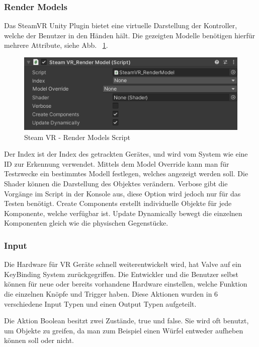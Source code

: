 \subsubsection{Render Models}
Das SteamVR Unity Plugin bietet eine virtuelle Darstellung der Kontroller, welche der Benutzer in den Händen hält.
Die gezeigten Modelle benötigen hierfür mehrere Attribute, siehe Abb. ~\ref{fig:steamvr_render_models Script}.
\begin {figure}
    \centering
    \includegraphics[scale=1]{pics/steamVR_render_models_script}
    \caption{Steam VR - Render Models Script}
    \label{fig:steamvr_render_models Script}
\end {figure}
Der Index ist der Index des getrackten Gerätes, und wird vom System wie eine ID zur Erkennung verwendet.
Mittels dem Model Override kann man für Testzwecke ein bestimmtes Modell festlegen, welches angezeigt werden soll.
Die Shader können die Darstellung des Objektes verändern.
Verbose gibt die Vorgänge im Script in der Konsole aus, diese Option wird jedoch nur für das Testen benötigt.
Create Components erstellt individuelle Objekte für jede Komponente, welche verfügbar ist.
Update Dynamically bewegt die einzelnen Komponenten gleich wie die physischen Gegenstücke.
~\cite{SteamVR_Render_Models_2022}

\subsubsection{Input}
Die Hardware für VR Geräte schnell weiterentwickelt wird, hat Valve auf ein KeyBinding System zurückgegriffen.
Die Entwickler und die Benutzer selbst können für neue oder bereits vorhandene Hardware einstellen, welche Funktion die einzelnen Knöpfe und Trigger haben.
Diese Aktionen wurden in 6 verschiedene Input Typen und einen Output Typen aufgeteilt.

Die Aktion Boolean besitzt zwei Zustände, true und false.
Sie wird oft benutzt, um Objekte zu greifen, da man zum Beispiel einen Würfel entweder aufheben können soll oder nicht.

